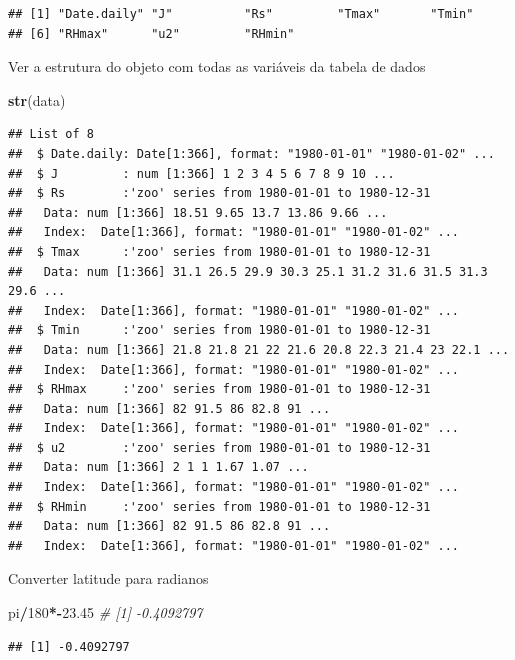 \documentclass[
]{book}
\newenvironment{Shaded}{\begin{snugshade}}{\end{snugshade}}
\newcommand{\CommentTok}[1]{\textcolor[rgb]{0.56,0.35,0.01}{\textit{#1}}}
\newcommand{\DecValTok}[1]{\textcolor[rgb]{0.00,0.00,0.81}{#1}}
\newcommand{\FloatTok}[1]{\textcolor[rgb]{0.00,0.00,0.81}{#1}}
\newcommand{\KeywordTok}[1]{\textcolor[rgb]{0.13,0.29,0.53}{\textbf{#1}}}
\newcommand{\NormalTok}[1]{#1}
\newcommand{\OperatorTok}[1]{\textcolor[rgb]{0.81,0.36,0.00}{\textbf{#1}}}
\begin{document}
\begin{verbatim}
## [1] "Date.daily" "J"          "Rs"         "Tmax"       "Tmin"      
## [6] "RHmax"      "u2"         "RHmin"
\end{verbatim}

Ver a estrutura do objeto com todas as variáveis da tabela de dados

\begin{Shaded}
\begin{Highlighting}[]
\KeywordTok{str}\NormalTok{(data)}
\end{Highlighting}
\end{Shaded}

\begin{verbatim}
## List of 8
##  $ Date.daily: Date[1:366], format: "1980-01-01" "1980-01-02" ...
##  $ J         : num [1:366] 1 2 3 4 5 6 7 8 9 10 ...
##  $ Rs        :'zoo' series from 1980-01-01 to 1980-12-31
##   Data: num [1:366] 18.51 9.65 13.7 13.86 9.66 ...
##   Index:  Date[1:366], format: "1980-01-01" "1980-01-02" ...
##  $ Tmax      :'zoo' series from 1980-01-01 to 1980-12-31
##   Data: num [1:366] 31.1 26.5 29.9 30.3 25.1 31.2 31.6 31.5 31.3 29.6 ...
##   Index:  Date[1:366], format: "1980-01-01" "1980-01-02" ...
##  $ Tmin      :'zoo' series from 1980-01-01 to 1980-12-31
##   Data: num [1:366] 21.8 21.8 21 22 21.6 20.8 22.3 21.4 23 22.1 ...
##   Index:  Date[1:366], format: "1980-01-01" "1980-01-02" ...
##  $ RHmax     :'zoo' series from 1980-01-01 to 1980-12-31
##   Data: num [1:366] 82 91.5 86 82.8 91 ...
##   Index:  Date[1:366], format: "1980-01-01" "1980-01-02" ...
##  $ u2        :'zoo' series from 1980-01-01 to 1980-12-31
##   Data: num [1:366] 2 1 1 1.67 1.07 ...
##   Index:  Date[1:366], format: "1980-01-01" "1980-01-02" ...
##  $ RHmin     :'zoo' series from 1980-01-01 to 1980-12-31
##   Data: num [1:366] 82 91.5 86 82.8 91 ...
##   Index:  Date[1:366], format: "1980-01-01" "1980-01-02" ...
\end{verbatim}

Converter latitude para radianos

\begin{Shaded}
\begin{Highlighting}[]
\NormalTok{pi}\OperatorTok{/}\DecValTok{180}\OperatorTok{*-}\FloatTok{23.45} \CommentTok{# [1] -0.4092797}
\end{Highlighting}
\end{Shaded}

\begin{verbatim}
## [1] -0.4092797
\end{verbatim}
\end{document}
